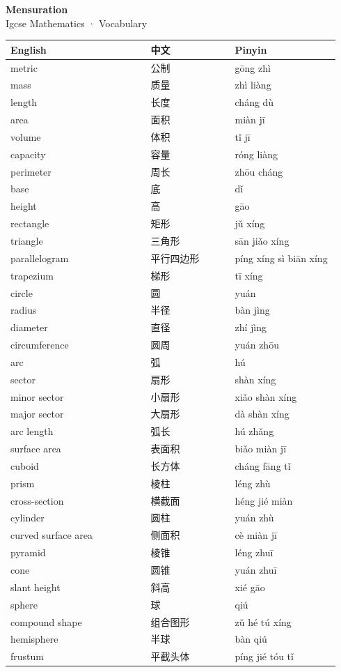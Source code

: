 \documentclass[11pt]{article}
\begin{document}
\begin{center}
  {\LARGE\bfseries Mensuration}\\[0.35em]
  {\large Igcse Mathematics · Vocabulary}
\end{center}
\vspace{0.6em}

\begin{longtable}{@{}p{0.40\linewidth}p{0.24\linewidth}p{0.30\linewidth}@{}}
\toprule
\textbf{English} & \textbf{中文} & \textbf{Pinyin} \\
\midrule
\endhead
\bottomrule
\endlastfoot
metric & 公制 & gōng zhì \\
mass & 质量 & zhì liàng \\
length & 长度 & cháng dù \\
area & 面积 & miàn jī \\
volume & 体积 & tǐ jī \\
capacity & 容量 & róng liàng \\
perimeter & 周长 & zhōu cháng \\
base & 底 & dǐ \\
height & 高 & gāo \\
rectangle & 矩形 & jǔ xíng \\
triangle & 三角形 & sān jiǎo xíng \\
parallelogram & 平行四边形 & píng xíng sì biān xíng \\
trapezium & 梯形 & tī xíng \\
circle & 圆 & yuán \\
radius & 半径 & bàn jìng \\
diameter & 直径 & zhí jìng \\
circumference & 圆周 & yuán zhōu \\
arc & 弧 & hú \\
sector & 扇形 & shàn xíng \\
minor sector & 小扇形 & xiǎo shàn xíng \\
major sector & 大扇形 & dà shàn xíng \\
arc length & 弧长 & hú zhǎng \\
surface area & 表面积 & biǎo miàn jī \\
cuboid & 长方体 & cháng fāng tǐ \\
prism & 棱柱 & léng zhù \\
cross-section & 横截面 & héng jié miàn \\
cylinder & 圆柱 & yuán zhù \\
curved surface area & 侧面积 & cè miàn jī \\
pyramid & 棱锥 & léng zhuī \\
cone & 圆锥 & yuán zhuī \\
slant height & 斜高 & xié gāo \\
sphere & 球 & qiú \\
compound shape & 组合图形 & zǔ hé tú xíng \\
hemisphere & 半球 & bàn qiú \\
frustum & 平截头体 & píng jié tóu tǐ \\
\end{longtable}
\end{document}
